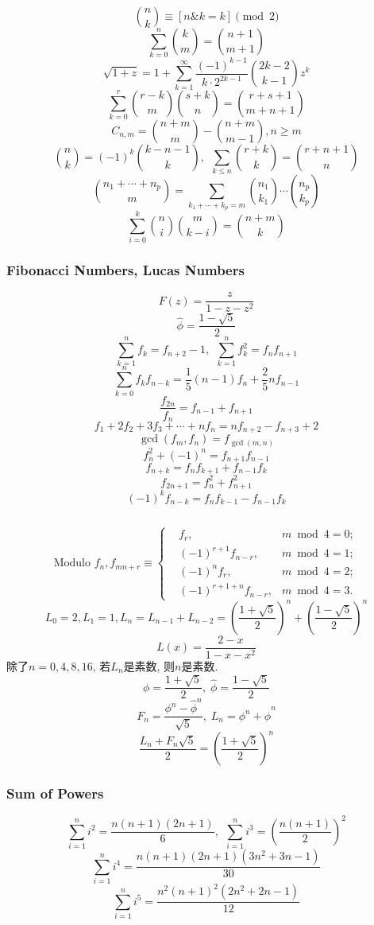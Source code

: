 \[ \binom{n}{k} \equiv [n\& k=k] \pmod 2 \]
\[ \sum_{k=0}^n \binom{k}{m} = \binom{n+1}{m+1} \]
\[ \sqrt{1+z} = 1 + \sum_{k=1}^{\infty}\frac{(-1)^{k-1}}{k\cdot 2^{2k-1}}\binom{2k-2}{k-1}z^k \]
\[ \sum_{k=0}^{r}\binom{r-k}{m}\binom{s+k}{n} = \binom{r+s+1}{m+n+1} \]
\[ C_{n, m} = \binom{n+m}{m} - \binom{n+m}{m-1}, n \geq m \]
\[ \binom{n}{k} = (-1)^k\binom{k-n-1}{k},\ \ \sum_{k \leq n}\binom{r+k}{k} = \binom{r+n+1}{n} \]
\[ \binom{n_1+\cdots+n_p}{m}=\sum_{k_1+\cdots+k_p=m}\binom{n_1}{k_1}\cdots\binom{n_p}{k_p}\]
\[ \sum_{i=0}^k \binom{n}{i}\binom{m}{k-i} = \binom{n+m}{k}\]

\subsubsection{Fibonacci Numbers, Lucas Numbers}
\[ F(z) = \frac{z}{1-z-z^2} \]
\[ \hat{\phi} = \frac{1-\sqrt{5}}{2} \]
\[ \sum_{k=1}^nf_k = f_{n+2}-1,\ \ \sum_{k=1}^nf^2_k = f_nf_{n+1} \]
\[ \sum_{k=0}^nf_kf_{n-k} = \frac{1}{5}(n-1)f_n+\frac{2}{5}nf_{n-1} \]
\[ \frac{f_{2n}}{f_n} = f_{n-1} + f_{n+1}\]
\[ f_1+2f_2+3f_3+\cdots+nf_n=nf_{n+2}-f_{n+3}+2\]
\[ \gcd(f_m,f_n)=f_{\gcd(m,n)}\]
\[ f^2_n + (-1)^n = f_{n+1}f_{n-1} \]
\[ f_{n+k} = f_nf_{k+1} + f_{n-1}f_k \]
\[ f_{2n+1} = f^2_n+f^2_{n+1} \]
\[ (-1)^kf_{n-k} = f_{n}f_{k-1} - f_{n-1}f_{k} \]
\begin{small}
\inputminted{python}{src/TipsandHints/fib.py}
\end{small}
\[ \text{Modulo }f_n, f_{mn+r} \equiv \left\{
\begin{aligned}
&f_r,& m \bmod 4 = 0; \\
&(-1)^{r+1}f_{n-r},& m \bmod 4 = 1; \\
&(-1)^nf_r,& m \bmod 4 = 2; \\
&(-1)^{r+1+n}f_{n-r},& m \bmod 4 = 3.
\end{aligned}
\right.
\]
\[ L_0=2,L_1=1,L_n=L_{n-1}+L_{n-2}=\left(\frac{1+\sqrt{5}}{2}\right)^n+\left(\frac{1-\sqrt{5}}{2}\right)^n \]
\[ L(x)=\frac{2-x}{1-x-x^2} \]
除了$n=0,4,8,16$, 若$L_n$是素数, 则$n$是素数.
$$\phi = \frac {1 + \sqrt 5} 2, \; \hat\phi = \frac {1 - \sqrt 5} 2$$
$$F_n = \frac {\phi^n - {\hat\phi} ^ n} {\sqrt 5}, \; L_n = \phi ^ n + {\hat\phi} ^ n$$
$$\frac {L_n + F_n \sqrt 5} 2 = \left( \frac {1 + \sqrt 5} 2 \right) ^ n$$

\subsubsection{Sum of Powers}
\[\sum_{i=1}^ni^2=\frac{n(n+1)(2n+1)}{6},\ \ \sum_{i=1}^ni^3=\left(\frac{n(n+1)}{2}\right)^2\]
\[\sum_{i=1}^ni^4=\frac{n(n+1)(2n+1)(3n^2+3n-1)}{30}\]
\[\sum_{i=1}^ni^5=\frac{n^2(n+1)^2(2n^2+2n-1)}{12}\]

